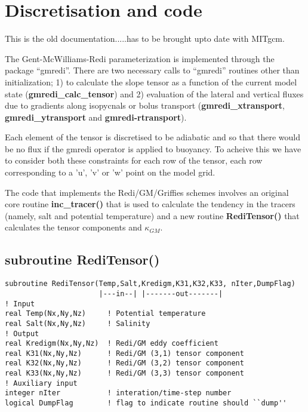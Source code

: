 
\section{Discretisation and code}

This is the old documentation.....has to be brought upto date with MITgcm.


The Gent-McWilliams-Redi parameterization is implemented through the
package ``gmredi''. There are two necessary calls to ``gmredi''
routines other than initialization; 1) to calculate the slope tensor
as a function of the current model state ({\bf gmredi\_calc\_tensor})
and 2) evaluation of the lateral and vertical fluxes due to gradients
along isopycnals or bolus transport ({\bf gmredi\_xtransport}, {\bf
gmredi\_ytransport} and {\bf gmredi-rtransport}).

Each element of the tensor is discretised to be adiabatic and so that
there would be no flux if the gmredi operator is applied to buoyancy.
To acheive this we have to consider both these constraints for each
row of the tensor, each row corresponding to a 'u', 'v' or 'w' point
on the model grid. 

The code that implements the Redi/GM/Griffies schemes involves an
original core routine {\bf inc\_tracer()} that is used to calculate
the tendency in the tracers (namely, salt and potential temperature)
and a new routine {\bf RediTensor()} that calculates the tensor
components and $\kappa_{GM}$.

\subsection{subroutine RediTensor()}

{\small
\begin{verbatim}
subroutine RediTensor(Temp,Salt,Kredigm,K31,K32,K33, nIter,DumpFlag)
                      |---in--| |-------out-------|
! Input
real Temp(Nx,Ny,Nz)     ! Potential temperature
real Salt(Nx,Ny,Nz)     ! Salinity
! Output
real Kredigm(Nx,Ny,Nz)  ! Redi/GM eddy coefficient
real K31(Nx,Ny,Nz)      ! Redi/GM (3,1) tensor component
real K32(Nx,Ny,Nz)      ! Redi/GM (3,2) tensor component
real K33(Nx,Ny,Nz)      ! Redi/GM (3,3) tensor component
! Auxiliary input
integer nIter           ! interation/time-step number
logical DumpFlag        ! flag to indicate routine should ``dump''
\end{verbatim}
}


